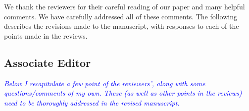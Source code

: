 \documentclass[pdftex,12pt]{article}
\def\rc#1{{\it\textcolor{blue}{#1}}\smallskip}
\begin{document}
\vspace*{5pt}

We thank the reviewers for their careful reading of our paper and many
helpful comments. We have carefully addressed all of these comments. The
following describes the revisions made to the manuscript, with 
responses to each of the points made in the reviews.

\subsection*{Associate Editor}

\rc{Below I recapitulate a few
point of the reviewers', along with some questions/comments of my own.
These (as well as other points in the reviews) need to be thoroughly
addressed in the revised manuscript.}
\end{document}

